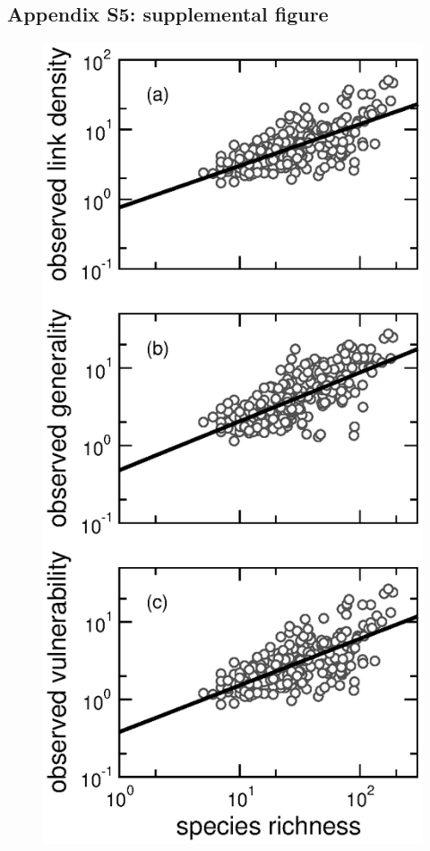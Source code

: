 \documentclass[12pt]{article}
\begin{document}
\clearpage

\subsection*{Appendix S5: supplemental figure}

  \begin{figure}[!h]
  \centerline{\includegraphics*[height=.75\textheight]{Figures/by_TL/scaling_with_S/proportions/S_fitlines_nonts_corrected_observed_corrected.eps}}

\end{figure}
\end{document}

